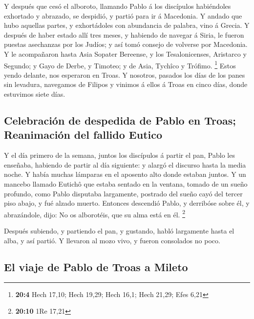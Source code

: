  Y después que cesó el alboroto, llamando Pablo á los
discípulos habiéndoles exhortado y abrazado, se despidió, y partió para
ir á Macedonia.  Y andado que hubo aquellas partes, y
exhortádoles con abundancia de palabra, vino á Grecia.  Y
después de haber estado allí tres meses, y habiendo de navegar á Siria,
le fueron puestas asechanzas por los Judíos; y así tomó consejo de
volverse por Macedonia.  Y le acompañaron hasta Asia Sopater
Bereense, y los Tesalonicenses, Aristarco y Segundo; y Gayo de Derbe, y
Timoteo; y de Asia, Tychîco y Trófimo. \footnote{\textbf{20:4} Hech
  17,10; Hech 19,29; Hech 16,1; Hech 21,29; Efes 6,21} 
Estos yendo delante, nos esperaron en Troas.  Y nosotros,
pasados los días de los panes sin levadura, navegamos de Filipos y
vinimos á ellos á Troas en cinco días, donde estuvimos siete días.

\hypertarget{celebraciuxf3n-de-despedida-de-pablo-en-troas-reanimaciuxf3n-del-fallido-eutico}{%
\subsection{Celebración de despedida de Pablo en Troas; Reanimación del
fallido
Eutico}\label{celebraciuxf3n-de-despedida-de-pablo-en-troas-reanimaciuxf3n-del-fallido-eutico}}

 Y el día primero de la semana, juntos los discípulos á
partir el pan, Pablo les enseñaba, habiendo de partir al día siguiente:
y alargó el discurso hasta la media noche.  Y había muchas
lámparas en el aposento alto donde estaban juntos.  Y un
mancebo llamado Eutichô que estaba sentado en la ventana, tomado de un
sueño profundo, como Pablo disputaba largamente, postrado del sueño cayó
del tercer piso abajo, y fué alzado muerto.  Entonces
descendió Pablo, y derribóse sobre él, y abrazándole, dijo: No os
alborotéis, que su alma está en él. \footnote{\textbf{20:10} 1Re 17,21}

 Después subiendo, y partiendo el pan, y gustando, habló
largamente hasta el alba, y así partió.  Y llevaron al mozo
vivo, y fueron consolados no poco.

\hypertarget{el-viaje-de-pablo-de-troas-a-mileto}{%
\subsection{El viaje de Pablo de Troas a
Mileto}\label{el-viaje-de-pablo-de-troas-a-mileto}}

